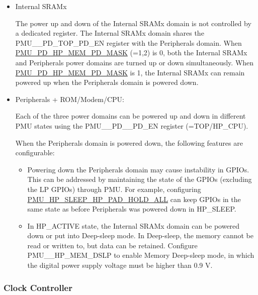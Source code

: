 \documentclass[main\_\_EN.tex]{subfiles}
\begin{document}
\begin{itemize}
    \item Internal SRAMx

    The power up and down of the Internal SRAMx domain is not controlled by a dedicated register. The Internal SRAMx domain shares the PMU\_\_PD\_TOP\_PD\_EN register with the Peripherals domain. When \hyperref[fielddesc:PMUPDHPMEM1PDMASK]{PMU\_PD\_HP\_MEM\_PD\_MASK} (=1,2) is 0, both the Internal SRAMx and Peripherals power domains are turned up or down simultaneously. When \hyperref[fielddesc:PMUPDHPMEM1PDMASK]{PMU\_PD\_HP\_MEM\_PD\_MASK} is 1, the Internal SRAMx can remain powered up when the Peripherals domain is powered down.



    \item Peripherals + ROM/Modem/CPU:

    Each of the three power domains can be powered up and down in different PMU states using the PMU\_\_PD\_\_PD\_EN register (=TOP/HP\_CPU).

    When the Peripherals domain is powered down, the following features are configurable:
        \begin{itemize}
        \item Powering down the Peripherals domain may cause instability in GPIOs. This can be addressed by maintaining the state of the GPIOs (excluding the LP GPIOs) through PMU. For example, configuring \hyperref[fielddesc:PMUHPSLEEPHPPADHOLDALL]{PMU\_HP\_SLEEP\_HP\_PAD\_HOLD\_ALL} can keep GPIOs in the same state as before Peripherals was powered down in HP\_SLEEP.

        \item In HP\_ACTIVE state, the Internal SRAMx domain can be powered down or put into Deep-sleep mode. In Deep-sleep, the memory cannot be read or written to, but data can be retained. Configure PMU\_\_HP\_MEM\_DSLP to enable Memory Deep-sleep mode, in which the digital power supply voltage must be higher than 0.9 V.
        \end{itemize}



\end{itemize}

\subsubsection{Clock Controller}
\end{document}
